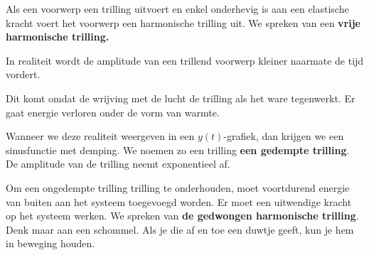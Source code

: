 \documentclass{ximera}
\begin{document}
    \author{Ingmar Herreman}
    \date{Februari 2024}


\def\tick#1#2{\draw[thick] (#1)++(#2:0.12) --++ (#2-180:0.24)}
\def\N{100} %


Als een voorwerp een trilling uitvoert en enkel onderhevig is aan een elastische kracht voert het voorwerp een harmonische trilling uit. We spreken van een \textbf{vrije harmonische trilling.}

In realiteit wordt de amplitude van een trillend voorwerp kleiner naarmate de tijd vordert. 

Dit komt omdat de wrijving met de lucht de trilling als het ware tegenwerkt. Er gaat energie verloren onder de vorm van warmte.
\begin{center}
\end{center}
Wanneer we deze realiteit weergeven in een $y(t)$-grafiek, dan krijgen we een sinusfunctie met demping. We noemen zo een trilling \textbf{een gedempte trilling}. De amplitude van de trilling neemt exponentieel af.

Om een ongedempte trilling trilling te onderhouden, moet voortdurend energie van buiten aan het systeem toegevoegd worden. Er moet een uitwendige kracht op het systeem werken. We spreken van \textbf{de gedwongen harmonische trilling}.
Denk maar aan een schommel. Als je die af en toe een duwtje geeft, kun je hem in beweging houden.
\end{document}
